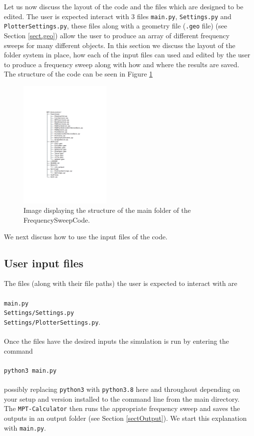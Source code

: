 Let us now discuss the layout of the code and the files which are designed to be edited. The user is expected interact with 3 files \texttt{main.py}, \texttt{Settings.py} and \texttt{PlotterSettings.py}, these files along with a geometry file (\texttt{.geo} file) (see Section \ref{sect.geo}) allow the user to produce an array of different frequency sweeps for many different objects. In this section we discuss the layout of the folder system in place, how each of the input files can used and edited by the user to produce a frequency sweep along with how and where the results are saved. The structure of the code can be seen in Figure \ref{fig:FrequencySweepCode}
\begin{figure}[H]
\begin{center}
\includegraphics[width=0.4\textwidth]{Figures/CodeLayout}
\caption{Image displaying the structure of the main folder of the FrequencySweepCode.}\label{fig:FrequencySweepCode}
\end{center}
\end{figure}
\noindent
We next discuss how to use the input files of the code.\\
\subsection{User input files}
The files (along with their file paths) the user is expected to interact with are\\
\\
\texttt{main.py}\\
\texttt{Settings/Settings.py}\\
\texttt{Settings/PlotterSettings.py}.\\
\\
Once the files have the desired inputs the simulation is run by entering the command\\
\\
\texttt{python3 main.py}\\
\\
possibly replacing \texttt{python3} with \texttt{python3.8} here and throughout depending on your setup and version installed to the command line from the main directory. The \texttt{MPT-Calculator} then runs the appropriate frequency sweep and saves the outputs in an output folder (see Section \ref{sectOutput}).
We start this explanation with \texttt{main.py}.

